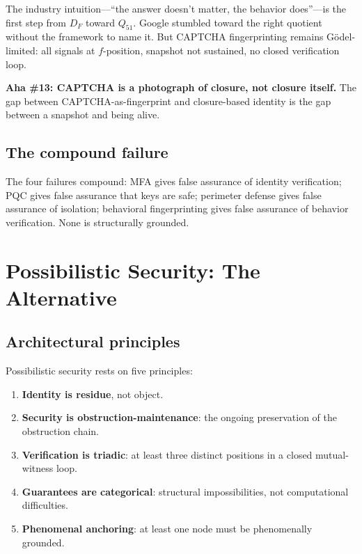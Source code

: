 \documentclass[11pt,a4paper]{article}
\theoremstyle{definition}
\theoremstyle{remark}
\newcommand{\aha}[2]{\medskip\textbf{Aha \##1: #2}}
\begin{document}
The industry intuition---``the answer doesn't matter, the behavior does''---is the first step from $D_F$ toward $Q_{51}$. Google stumbled toward the right quotient without the framework to name it. But CAPTCHA fingerprinting remains G\"odel-limited: all signals at $f$-position, snapshot not sustained, no closed verification loop.

\aha{13}{CAPTCHA is a photograph of closure, not closure itself.} The gap between CAPTCHA-as-fingerprint and closure-based identity is the gap between a snapshot and being alive.

\subsection{The compound failure}

The four failures compound: MFA gives false assurance of identity verification; PQC gives false assurance that keys are safe; perimeter defense gives false assurance of isolation; behavioral fingerprinting gives false assurance of behavior verification. None is structurally grounded.

\section{Possibilistic Security: The Alternative}

\subsection{Architectural principles}

Possibilistic security rests on five principles:
\begin{enumerate}[label=(P\arabic*)]
\item \textbf{Identity is residue}, not object.
\item \textbf{Security is obstruction-maintenance}: the ongoing preservation of the obstruction chain.
\item \textbf{Verification is triadic}: at least three distinct positions in a closed mutual-witness loop.
\item \textbf{Guarantees are categorical}: structural impossibilities, not computational difficulties.
\item \textbf{Phenomenal anchoring}: at least one node must be phenomenally grounded.
\end{enumerate}
\end{document}
